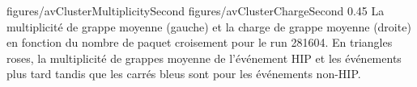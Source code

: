                  {figures/avClusterMultiplicitySecond} %
                 {figures/avClusterChargeSecond} %
                 {0.45}       %
                 {La multiplicité de grappe moyenne (gauche) et la charge de grappe moyenne (droite) en fonction du nombre de paquet croisement pour le run 281604. En triangles roses, la multiplicité de grappes moyenne de l’événement HIP et les événements plus tard tandis que les carrés bleus sont pour les événements non-HIP. }




